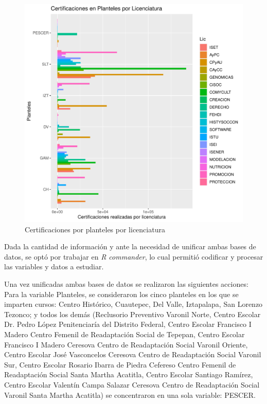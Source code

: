 \documentclass[12pt]{article}
\begin{document}
\begin{figure}
\centering
\includegraphics[scale=0.45]{Graficas/ggplotBarplotPlantelLic2.pdf}
\caption{Certificaciones por planteles por licenciatura}
\label{Fig.Cert.Plantel-Lic2}
\end{figure}



Dada la cantidad de informaci\'on y ante la necesidad de unificar ambas bases de datos, se opt\'o por trabajar en \textit{R commander}, lo cual permiti\'o codificar y procesar las variables y datos a estudiar.




Una vez unificadas ambas bases de datos se realizaron las siguientes acciones:
Para la variable Planteles, se consideraron los cinco planteles en los que se imparten cursos: Centro Hist\'orico, Cuautepec, Del Valle, Iztapalapa, San Lorenzo Tezonco; y todos los dem\'as (Reclusorio Preventivo Varonil Norte, Centro Escolar Dr. Pedro L\'opez Penitenciar\'ia del Distrito Federal, Centro Escolar Francisco I Madero Centro Femenil de Readaptaci\'on Social de Tepepan, Centro Escolar Francisco I Madero Ceresova Centro de Readaptaci\'on Social Varonil Oriente, Centro Escolar Jos\'e Vasconcelos Ceresova Centro de Readaptaci\'on Social Varonil Sur, Centro Escolar Rosario Ibarra de Piedra Cefereso Centro Femenil de Readaptaci\'on Social Santa Martha Acatitla, Centro Escolar Santiago Ram\'irez, Centro Escolar Valent\'in Campa Salazar Ceresova Centro de Readaptaci\'on Social Varonil Santa Martha Acatitla) se concentraron en una sola variable: PESCER.
\end{document}
